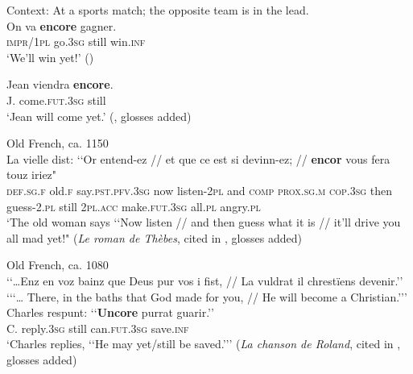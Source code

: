 \begin{exe}
	\ex Context: At a sports match; the opposite team is in the lead.\\
	\gll On va \textbf{encore} gagner.\\
	\textsc{impr}/1\textsc{pl} go.3\textsc{sg} still win.\textsc{inf}\\
	\glt \lq We'll win yet!' (\cite[142]{Koenig1991})

	\ex\label{exAppendixFrenchEncoreProspective}
	\gll Jean viendra \textbf{encore}.\\
	J. come.\textsc{fut}.3\textsc{sg} still\\
	\glt \lq Jean will come yet.' (\cite[128]{HoepelmanRohrer1980}, glosses added)
	
	\ex Old French, ca. 1150\label{exAppendixFrenchEncoreProspectiveOld1}\\
	\gll La vielle dist: \lq\lq Or entend-ez // et que ce est si devinn-ez; // \textbf{encor} vous fera touz iriez"\\
	\textsc{def}.\textsc{sg}.\textsc{f} old.\textsc{f} say.\textsc{pst}.\textsc{pfv}.3\textsc{sg} \phantom{\lq\lq}now listen-2\textsc{pl} {} and \textsc{comp} \textsc{prox}.\textsc{sg}.\textsc{m} \textsc{cop}.3\textsc{sg} then guess-2.\textsc{pl} {} still 2\textsc{pl}.\textsc{acc} make.\textsc{fut}.3\textsc{sg} all.\textsc{pl} angry.\textsc{pl}\\
	\glt \lq The old woman says \lq\lq Now listen // and then guess what it is // it’ll drive you all mad yet!" (\textit{Le roman de Thèbes}, cited in \cite[146]{MosegaardHansen2008}, glosses added)

		\ex Old French, ca. 1080\label{exAppendixFrenchEncoreProspectiveOld2}\\
		\lq\lq …Enz en voz bainz que Deus pur vos i fist, // La vuldrat il chrestïens devenir.\rq\rq\\
		\lq {\lq\lq}… There, in the baths that God made for you, // He will become a Christian.{\rq\rq}\rq
		\sn
		\gll Charles respunt: \lq\lq{}\textbf{Uncore} purrat guarir.\rq\rq\\
		C. reply.3\textsc{sg} \phantom{\lq\lq}still can.\textsc{fut}.3\textsc{sg} save.\textsc{inf}\\
		\glt \lq Charles replies, \lq\lq He may yet/still be saved.{\rq\rq}\rq{ }(\textit{La chanson de Roland}, cited in \cite[146 fn 12]{MosegaardHansen2008}, glosses added)
\end{exe}



